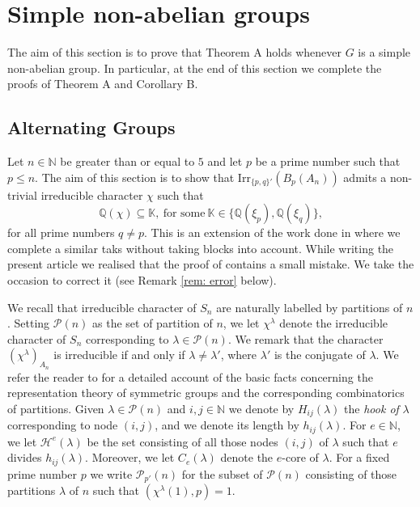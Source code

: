 \documentclass[a4paper,12pt,leqno]{amsart}
\newcommand{\6}{^}
\theoremstyle{definition}
\theoremstyle{definition}
\theoremstyle{definition}
\theoremstyle{definition}
\theoremstyle{definition}
\begin{document}
\section{Simple non-abelian groups}\label{sec:2}

The aim of this section is to prove that Theorem A holds whenever $G$ is a simple non-abelian group. In particular, at the end of this section we complete the proofs of Theorem A and Corollary B.

\subsection{Alternating Groups}
Let $n\in\mathbb{N}$ be greater than or equal to $5$ and let $p$ be a prime number such that $p\leq n$. The aim of this section is to show that $\mathrm{Irr}_{\{p,q\}'}(B_p(A_n))$ admits a non-trivial irreducible character $\chi$ such that $$\mathbb{Q}(\chi)\subseteq \mathbb{K},\ \text{for some}\ \mathbb{K}\in\{\mathbb{Q}(\xi_p), \mathbb{Q}(\xi_q)\},$$ for all prime numbers $q\neq p$. 
This is an extension of the work done in \cite[Theorem D]{GHSV21} where we complete a similar taks without taking blocks into account. While writing the present article we realised that the proof of \cite[Theorem D]{GHSV21} contains a small mistake. We take the occasion to correct it (see Remark \ref{rem: error} below). 

We recall that irreducible character of $S_n$ are naturally labelled by partitions of $n$. Setting $\mathcal{P}(n)$ as the set of partition of $n$, we let $\chi^\lambda$ denote the irreducible character of $S_n$ corresponding to $\lambda\in\mathcal{P}(n)$. 
We remark that the character $(\chi^\lambda)_{A_n}$ is irreducible if and only if $\lambda\neq \lambda'$, where $\lambda'$ is the conjugate of $\lambda$.
We refer the reader to \cite{OlssonBook} for a detailed account of the basic facts concerning the representation theory of symmetric groups and the corresponding combinatorics of partitions. Given $\lambda\in\mathcal{P}(n)$ 
 and $i,j\in\mathbb{N}$ we denote by
$H_{ij}(\lambda)$ the \textit{hook of} $\lambda$
corresponding to node $(i,j)$, and we denote its length by $h_{ij}(\lambda)$. 
For $e\in\mathbb{N}$, we let
$\mathcal{H}^{e}(\lambda)$ be the set consisting of all those nodes
$(i,j)$ of $\lambda$ such that $e$ divides $h_{ij}(\lambda)$.
Moreover, we let $C_e(\lambda)$ denote the $e$-core of $\lambda$.
For a fixed prime number $p$ we write $\mathcal{P}_{p'}(n)$ for the subset of $\mathcal{P}(n)$ consisting of those partitions $\lambda$ of $n$ such that $(\chi^\lambda(1), p)=1$. 
\end{document}

